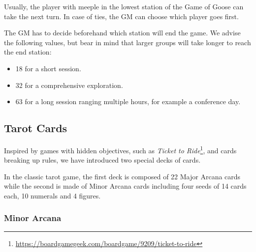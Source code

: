 \documentclass{article}
\begin{document}
\begin{multicols}{2}
Usually, the player with meeple in the lowest station of the Game of Goose can take the next turn. In case of ties, the GM can choose which player goes first.

The GM has to decide beforehand which station will end the game. We advise the following values, but bear in mind that larger groups will take longer to reach the end station:

\begin{itemize}
\item 18 for a short session.
\item 32 for a comprehensive exploration.
\item 63 for a long session ranging multiple hours, for example a conference day.

\end{itemize}

\vspace{1cm}

\subsection{Tarot Cards}

Inspired by games with hidden objectives, such as \textit{Ticket to Ride}\footnote{\url{https://boardgamegeek.com/boardgame/9209/ticket-to-ride}}, and cards breaking up rules, we have introduced two special decks of cards.

In the classic tarot game, the first deck is composed of 22 Major Arcana cards while the second is made of Minor Arcana cards including four seeds of 14 cards each, 10 numerals and 4 figures. 

\subsubsection{Minor Arcana}


\end{multicols}
\end{document}
